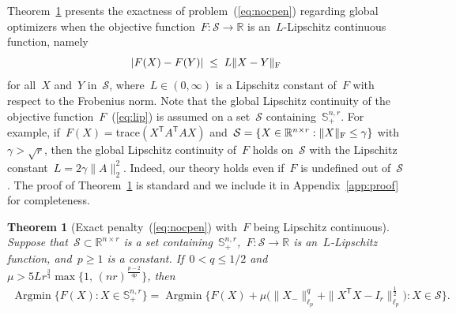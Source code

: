 \documentclass[11pt,a4paper]{article}  %
\newtheorem{theorem}{Theorem}%
\theoremstyle{definition}
\DeclareMathOperator*{\Argmin}{Argmin}
\newcommand{\RR}{\mathbb{R}}
\newcommand{\sset}{\mathcal{S}}
\newcommand{\penpar}{\mu}
\newcommand{\col}{r}
\newcommand{\stf}[1]{\mathbb{S}^{#1}}
\newcommand{\fro}{{\scriptstyle{\textnormal{F}}}}
\newcommand{\trs}{{\scriptstyle{\mathsf{T}}}}
\begin{document}
Theorem~\ref{th:exactposorth} presents the exactness of problem~(\ref{eq:nocpen}) regarding global optimizers
when the objective function~$F\mathrel{:}\sset \to \RR$ is an~$L$-Lipschitz continuous function, namely
\begin{equation}
    \label{eq:lip}
    |F(X) - F(Y)| \;\le\; L \|X-Y\|_\fro
\end{equation}
for all~$X$ and~$Y$ in~$\sset$,
where~$L\in(0,\infty)$ is a Lipschitz constant of~$F$ with respect to the Frobenius norm.
Note that the global Lipschitz continuity of the objective function~$F$~(\ref{eq:lip}) is assumed on
a set~$\sset$ containing~$ \stf{n,\col}_+$.  For example,
if~$F(X)=$trace$(X^\trs A^\trs A X)$  and~$\sset=\{X \in \RR^{n\times \col}:  \|X\|_\fro\le \gamma\}$
with~$\gamma>\sqrt{\col}$, then the global Lipschitz continuity of~$F$ holds on~$\sset$ with the
Lipschitz constant~$L=2\gamma\|A\|_2^2.$  Indeed,  our theory holds even if~$F$ is undefined out of~$\sset$.
{The proof of Theorem~\ref{th:exactposorth} is standard and we include it in
Appendix~\ref{app:proof} for completeness.}
\begin{theorem}[Exact penalty~(\ref{eq:nocpen}) with~$F$ being Lipschitz continuous]\label{th:exactposorth}
    Suppose that~$\sset\subset\RR^{n\times\col}$ is a set
    containing~$\stf{n,\col}_+$,~$F\mathrel{:} \sset\to\RR$
    is an~$L$-Lipschitz function, and~$p\ge 1$ is a constant.
If~$0< q \le 1/2$ and~$\penpar > 5L\col^{\frac{3}{4}}\max\Big\{1, \, (n\col)^{\frac{p-2}{4p}}\Big\}$, then
\begin{equation}
    \nonumber
    \begin{split}
    \Argmin\{F(X) \mathrel{:} X \!\in \stf{n,\col}_+\}
    = \Argmin\Big\{F(X) + \penpar \big(\|X_{-}\|_{\ell_p}^{q} + \|X^\trs
        X \!-\! I_\col\|_{\ell_p}^{\frac{1}{2}}\big)
    \mathrel{:} X \!\in \sset\Big\}.
    \end{split}
\end{equation}

\end{theorem}
\end{document}
